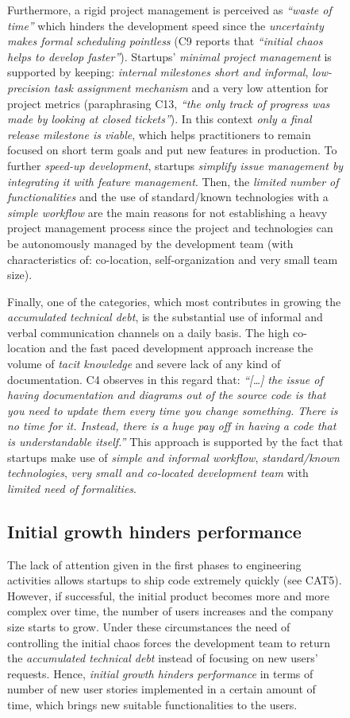 \documentclass[12pt,journal,compsoc]{../sty/IEEEtran}
\begin{document}
\begin{table}[!t]
\begin{figure}[!t]
\begin{compactitem}
Furthermore, a rigid project management is perceived as \textit{``waste of
time''} which hinders the development speed since the \textit{uncertainty makes
formal scheduling pointless} (C9  reports that \textit{``initial chaos helps to
develop faster''}). Startups' \textit{minimal project management}  is supported
by keeping: \textit{internal milestones short and informal},  \textit{low-
precision task assignment mechanism}  and a very low attention for  project
metrics (paraphrasing C13, \textit{``the only track of progress was made  by
looking at closed tickets''}). In this context \textit{only a final release
milestone is viable}, which helps practitioners to remain focused on short term
goals and put new features in production. To further \textit{speed-up
development}, startups \textit{simplify issue management by integrating it with
feature management}. Then, the \textit{limited number of functionalities} and
the {use of standard/known technologies} with a \textit{simple workflow} are the
main reasons for  not establishing a heavy project management process since the
project and  technologies can be autonomously managed by the development team
(with  characteristics of: co-location, self-organization and very small team
size).  %

Finally, one of the categories, which most contributes in growing the
\textit{accumulated technical debt}, is the substantial  use of informal and
verbal communication channels on a daily basis. The high co-location and the
fast paced development approach increase the volume of \textit{tacit knowledge}
and severe lack of any kind of documentation.  C4 observes in this regard that:
\textit{``[\ldots] the issue of having documentation and diagrams out of the
source code is that you need to update them every time you change something.
There is no time for it. Instead, there is a huge pay off in having a code that
is understandable itself.''} This approach is supported by the fact that
startups make use of   \textit{simple and informal workflow},
\textit{standard/known technologies},  \textit{very small and co-located
development team} with \textit{limited need of  formalities}.
\subsection{Initial growth hinders performance} \label{res:gsm:cat6} The lack of
attention given in the first phases to engineering activities  allows startups
to ship code extremely quickly (see CAT5). However, if  successful, the initial
product becomes more and more complex over time, the  number of users increases
and the company size starts to grow. Under these  circumstances the need of
controlling the initial chaos forces the development  team to return the
\textit{accumulated technical debt} instead of focusing on  new users' requests.
Hence, \textit{initial growth hinders performance} in terms  of number of new
user stories implemented in a certain amount of time, which  brings new suitable
functionalities to the users.



\end{compactitem}
\end{figure}
\end{table}
\end{document}
